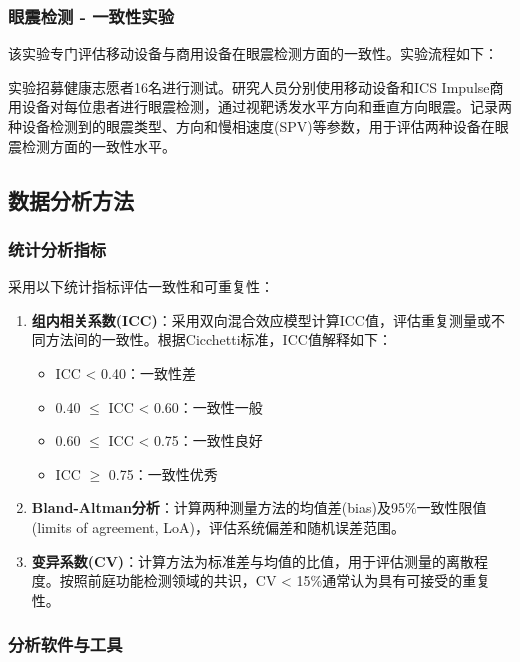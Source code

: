 \subsubsection{眼震检测 - 一致性实验}

该实验专门评估移动设备与商用设备在眼震检测方面的一致性。实验流程如下：

实验招募健康志愿者16名进行测试。研究人员分别使用移动设备和ICS Impulse商用设备对每位患者进行眼震检测，通过视靶诱发水平方向和垂直方向眼震。记录两种设备检测到的眼震类型、方向和慢相速度(SPV)等参数，用于评估两种设备在眼震检测方面的一致性水平。

\subsection{数据分析方法}

\subsubsection{统计分析指标}

采用以下统计指标评估一致性和可重复性：

\begin{enumerate}
  \item \textbf{组内相关系数(ICC)}：采用双向混合效应模型计算ICC值，评估重复测量或不同方法间的一致性。根据Cicchetti标准，ICC值解释如下：
  \begin{itemize}
    \item ICC < 0.40：一致性差
    \item 0.40 $\leq$ ICC < 0.60：一致性一般
    \item 0.60 $\leq$ ICC < 0.75：一致性良好
    \item ICC $\geq$ 0.75：一致性优秀
  \end{itemize}

  \item \textbf{Bland-Altman分析}：计算两种测量方法的均值差(bias)及95\%一致性限值(limits of agreement, LoA)，评估系统偏差和随机误差范围。

  \item \textbf{变异系数(CV)}：计算方法为标准差与均值的比值，用于评估测量的离散程度。按照前庭功能检测领域的共识，CV < 15\%通常认为具有可接受的重复性。
\end{enumerate}

\subsubsection{分析软件与工具}

